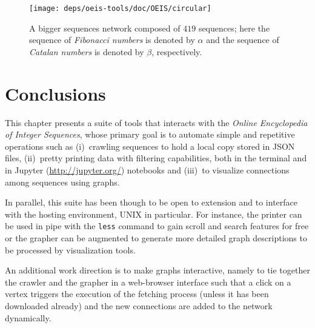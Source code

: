 \begin{figure}
\hspace{-3cm}
\texttt{[image: deps/oeis-tools/doc/OEIS/circular]}
\caption{A bigger sequences network composed of $419$ sequences; here the
sequence of \textit{Fibonacci numbers} is denoted by $\alpha$ and the sequence
of \textit{Catalan numbers} is denoted by $\beta$, respectively.}
\label{fig:oeis:sequences:network:fibonacci:catalan:circular}
\end{figure}

\section*{Conclusions}

This chapter presents a suite of tools that interacts with the \textit{Online
Encyclopedia of Integer Sequences}, whose primary goal is to automate simple
and repetitive operations such as (i)~crawling sequences to hold a local copy
stored in JSON files, (ii)~pretty printing data with filtering capabilities,
both in the terminal and in Jupyter (\url{http://jupyter.org/}) notebooks and
(iii)~to visualize connections among sequences using graphs.

In parallel, this suite has been though to be open to extension
and to interface with the hosting environment, UNIX in particular. For
instance, the printer can be used in pipe with the \verb|less| command to gain
scroll and search features for free or the grapher can be augmented to generate
more detailed graph descriptions to be processed by visualization tools.

An additional work direction is to make graphs interactive, namely to tie
together the crawler and the grapher in a web-browser interface such that a
click on a vertex triggers the execution of the fetching process (unless it has
been downloaded already) and the new connections are added to the network
dynamically.




\iffalse

\begin{figure}
\texttt{[image: deps/oeis-tools/doc/OEIS/fibonacci-catalan]}
\caption{Sequences network fetched by commands issued in the discussed session.}
\label{fig:oeis:sequences:network}
\end{figure}

\notbreakable{
    \inputminted[fontsize=\small,stripnl=false,firstline=31,lastline=44]
        {python}{deps/oeis-tools/src/graphing.py}
}

\notbreakable{
    \inputminted[fontsize=\small,stripnl=false,firstline=46,lastline=76]
        {python}{deps/oeis-tools/src/graphing.py}
}

\fi

